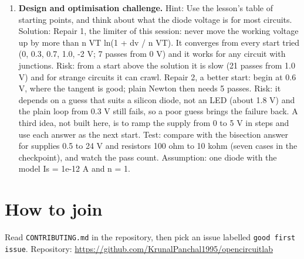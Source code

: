 \documentclass[11pt,a4paper]{article}
\begin{document}
\begin{enumerate}[nosep]
\item \textbf{Design and optimisation challenge.} Hint: Use the lesson's table of starting points, and think about what the diode voltage is for most circuits. Solution: Repair 1, the limiter of this session: never move the working voltage up by more than n VT ln(1 + dv / n VT). It converges from every start tried (0, 0.3, 0.7, 1.0, -2 V; 7 passes from 0 V) and it works for any circuit with junctions. Risk: from a start above the solution it is slow (21 passes from 1.0 V) and for strange circuits it can crawl. Repair 2, a better start: begin at 0.6 V, where the tangent is good; plain Newton then needs 5 passes. Risk: it depends on a guess that suits a silicon diode, not an LED (about 1.8 V) and the plain loop from 0.3 V still fails, so a poor guess brings the failure back. A third idea, not built here, is to ramp the supply from 0 to 5 V in steps and use each answer as the next start. Test: compare with the bisection answer for supplies 0.5 to 24 V and resistors 100 ohm to 10 kohm (seven cases in the checkpoint), and watch the pass count. Assumption: one diode with the model Is = 1e-12 A and n = 1.
\end{enumerate}

\section{How to join}
Read \texttt{CONTRIBUTING.md} in the repository, then pick an issue labelled \texttt{good first issue}. Repository: \url{https://github.com/KrunalPanchal1995/opencircuitlab}
\end{document}
